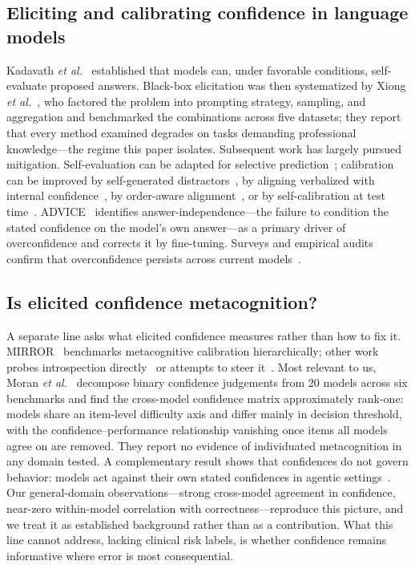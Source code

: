 \documentclass[journal,twoside]{IEEEtran}
\begin{document}
\subsection{Eliciting and calibrating confidence in language models}
Kadavath \emph{et al.}~\cite{kadavath2022} established that models can, under favorable conditions,
self-evaluate proposed answers. Black-box elicitation was then systematized by Xiong \emph{et
al.}~\cite{xiong2023}, who factored the problem into prompting strategy, sampling, and aggregation
and benchmarked the combinations across five datasets; they report that every method examined
degrades on tasks demanding professional knowledge---the regime this paper isolates. Subsequent work
has largely pursued mitigation. Self-evaluation can be adapted for selective
prediction~\cite{selfeval2023}; calibration can be improved by self-generated
distractors~\cite{distractor2025}, by aligning verbalized with internal
confidence~\cite{dca2025,latentconf2026}, by order-aware alignment~\cite{orce2026}, or by
self-calibration at test time~\cite{selfcal2025}. ADVICE~\cite{advice2025} identifies
answer-independence---the failure to condition the stated confidence on the model's own
answer---as a primary driver of overconfidence and corrects it by fine-tuning. Surveys and empirical
audits confirm that overconfidence persists across current
models~\cite{overconf2026,calsurvey2026,tokenprob2026}.

\subsection{Is elicited confidence metacognition?}
A separate line asks what elicited confidence measures rather than how to fix it.
MIRROR~\cite{mirror2026} benchmarks metacognitive calibration hierarchically; other work probes
introspection directly~\cite{introspect2026} or attempts to steer it~\cite{steermeta2026}. Most
relevant to us, Moran \emph{et al.}~\cite{metacog2026} decompose binary confidence judgements from
20 models across six benchmarks and find the cross-model confidence matrix approximately rank-one:
models share an item-level difficulty axis and differ mainly in decision threshold, with the
confidence--performance relationship vanishing once items all models agree on are removed. They
report no evidence of individuated metacognition in any domain tested. A complementary result shows
that confidences do not govern behavior: models act against their own stated
confidences in agentic settings~\cite{actionbelief2025}. Our general-domain observations---strong
cross-model agreement in confidence, near-zero within-model correlation with correctness---reproduce
this picture, and we treat it as established background rather than as a contribution. What this
line cannot address, lacking clinical risk labels, is whether confidence remains informative where
error is most consequential.
\end{document}

